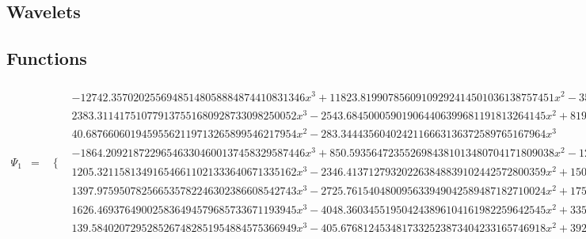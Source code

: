 \documentclass{article}
\begin{document}
 \begin{landscape}
\section{Wavelets}
\subsection{Functions}
 \begin{eqnarray*}
\Psi_1 & = & \begin{array}{cc}
 \{ & 
\begin{array}{cc}
 -12742.35702025569485148058884874410831346 x^3+11823.81990785609109292414501036138757451 x^2-3575.333898100583751493705321935412440169 x+352.3640543407275973671801533899048058352 & x\geq \frac{1}{4}\land x<\frac{3}{8} \\
 2383.311417510779137551680928733098250052 x^3-2543.684500059019064406399681191813264145 x^2+819.1530356530176523812143843562916698395 x-72.78090997665196497668049076646493235501 & x\geq \frac{3}{8}\land x<\frac{1}{2} \\
 40.68766060194595562119713265899546217954 x^2-283.3444356040242116663136372589765167964 x^3 & x\geq 0\land x<\frac{1}{8} \\
 -1864.209218722965463304600137458329587446 x^3+850.5935647235526984381013480704171809038 x^2-128.3734393217013145336813741560107544944 x+6.479526692841741092302071724399741422842 & x\geq \frac{1}{8}\land x<\frac{1}{4} \\
 1205.321158134916546611021333640671335162 x^3-2346.413712793202263848839102442572800359 x^2+1505.374942919097795029148501926371392221 x-317.9607780041634125724552448522615451309 & x\geq \frac{1}{2}\land x<\frac{5}{8} \\
 1397.975950782566535782246302386608542743 x^3-2725.761540480095633949042589487182710024 x^2+1753.792392393749676594373600482988614167 x-372.0738002218707889928350402085851389544 & x\geq \frac{5}{8}\land x<\frac{3}{4} \\
 1626.469376490025836494579685733671193945 x^3-4048.360345519504243896104161982259642545 x^2+3352.107944071525021562903374827435789046 x-923.2443001158693471120258825379818015458 & x\geq \frac{3}{4}\land x<\frac{7}{8} \\
 139.5840207295285267482851954884575366949 x^3-405.6768124534817332523873404233165746918 x^2+392.6015627183778862599190943812605392988 x-126.5087709944246797558169494464015013019 & x\geq \frac{7}{8}\land x<1
\end{array}


\end{array}
\end{eqnarray*}
\end{landscape}
\end{document}
